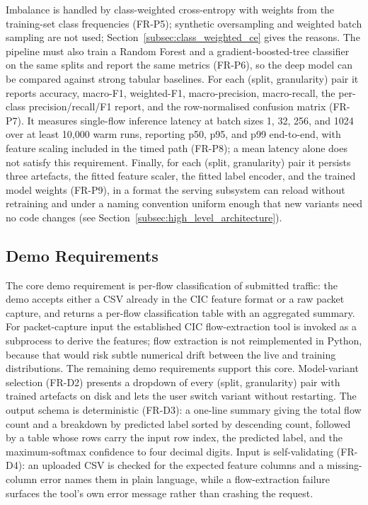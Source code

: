 \par Imbalance is handled by class-weighted cross-entropy with weights from the training-set class frequencies (FR-P5); synthetic oversampling and weighted batch sampling are not used; Section~\ref{subsec:class_weighted_ce} gives the reasons. The pipeline must also train a Random Forest and a gradient-boosted-tree classifier on the same splits and report the same metrics (FR-P6), so the deep model can be compared against strong tabular baselines. For each (split, granularity) pair it reports accuracy, macro-F1, weighted-F1, macro-precision, macro-recall, the per-class precision/recall/F1 report, and the row-normalised confusion matrix (FR-P7). It measures single-flow inference latency at batch sizes 1, 32, 256, and 1024 over at least 10{,}000 warm runs, reporting p50, p95, and p99 end-to-end, with feature scaling included in the timed path (FR-P8); a mean latency alone does not satisfy this requirement. Finally, for each (split, granularity) pair it persists three artefacts, the fitted feature scaler, the fitted label encoder, and the trained model weights (FR-P9), in a format the serving subsystem can reload without retraining and under a naming convention uniform enough that new variants need no code changes (see Section~\ref{subsec:high_level_architecture}).

\subsection{Demo Requirements}
\label{subsec:demo_requirements}

\par The core demo requirement is per-flow classification of submitted traffic: the demo accepts either a CSV already in the CIC feature format or a raw packet capture, and returns a per-flow classification table with an aggregated summary. For packet-capture input the established CIC flow-extraction tool is invoked as a subprocess to derive the features; flow extraction is not reimplemented in Python, because that would risk subtle numerical drift between the live and training distributions. The remaining demo requirements support this core. Model-variant selection (FR-D2) presents a dropdown of every (split, granularity) pair with trained artefacts on disk and lets the user switch variant without restarting. The output schema is deterministic (FR-D3): a one-line summary giving the total flow count and a breakdown by predicted label sorted by descending count, followed by a table whose rows carry the input row index, the predicted label, and the maximum-softmax confidence to four decimal digits. Input is self-validating (FR-D4): an uploaded CSV is checked for the expected feature columns and a missing-column error names them in plain language, while a flow-extraction failure surfaces the tool's own error message rather than crashing the request.

